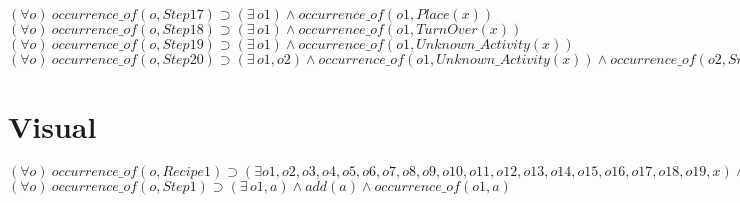 \documentclass[10pt,a4paper]{article}
\begin{document}
$	(\forall o) \ occurrence\_of(o,Step17) \supset (\exists\, o1) \wedge occurrence\_of(o1,Place(x))$\\
	
$	(\forall o) \ occurrence\_of(o,Step18) \supset (\exists\, o1) \wedge occurrence\_of(o1,TurnOver(x)) $\\
	
$	(\forall o) \ occurrence\_of(o,Step19) \supset (\exists\, o1) \wedge occurrence\_of(o1,Unknown\_Activity(x))$\\
	
	$(\forall o) \ occurrence\_of(o,Step20) \supset (\exists\, o1,o2) \wedge occurrence\_of(o1,Unknown\_Activity(x)) \wedge occurrence\_of(o2,Snap(x))\wedge next\_subacc(o1,o2)$\\
	

	
	\section{Visual}
	

$	(\forall o) \ occurrence\_of(o,Recipe1) \supset (\exists o1,o2,o3,o4,o5,o6,o7,o8,o9,o10,o11,o12,o13,o14,o15, o16,o17,o18,o19,x) \wedge occurrence\_of(o1,Step1(x)) \wedge occurrence\_of(o2,Step2(x)) \wedge occurrence\_of(o3,Step3(x)) \wedge occurrence\_of(o4,Step4(x)) \wedge occurrence\_of(o5,Step5(x)) \wedge occurrence\_of(o5,Step6(x)) \wedge occurrence\_of(o3,Step7(x)) \wedge occurrence\_of(o4,Step8(x)) \wedge occurrence\_of(o5,Step9(x)) \wedge occurrence\_of(o5,Step10(x)) \wedge occurrence\_of(o1,Step11(x)) \wedge occurrence\_of(o2,Step12(x)) \wedge occurrence\_of(o3,Step13(x)) \wedge occurrence\_of(o4,Step14(x)) \wedge occurrence\_of(o5,Step15(x)) \wedge occurrence\_of(o5,Step16(x)) \wedge occurrence\_of(o3,Step17(x)) \wedge occurrence\_of(o4,Step18(x)) \wedge occurrence\_of(o5,Step19(x)) \wedge	next\_subacc(o1,o2) \wedge next\_subacc(o2,o3) \wedge next\_subacc(o3,o4) \wedge next\_subacc(o4,o5) \wedge	next\_subacc(o5,o6) \wedge next\_subacc(o6,o7) \wedge next\_subacc(o7,o8) \wedge next\_subacc(o8,o9) \wedge next\_subacc(o9,o10) \wedge next\_subacc(o10,o11) \wedge next\_subacc(o11,o12) \wedge	next\_subacc(o12,o13) \wedge next\_subacc(o13,o14) \wedge next\_subacc(o14,o15) \wedge next\_subacc(o15,o16) \wedge next\_subacc(o16,o17) \wedge next\_subacc(o17,o18) \wedge next\_subacc(o18,o19) $\\ 
	
$	(\forall o) \ occurrence\_of(o,Step1) \supset (\exists\, o1,a) \wedge add(a) \wedge occurrence\_of(o1,a) $\\
	
\end{document}
